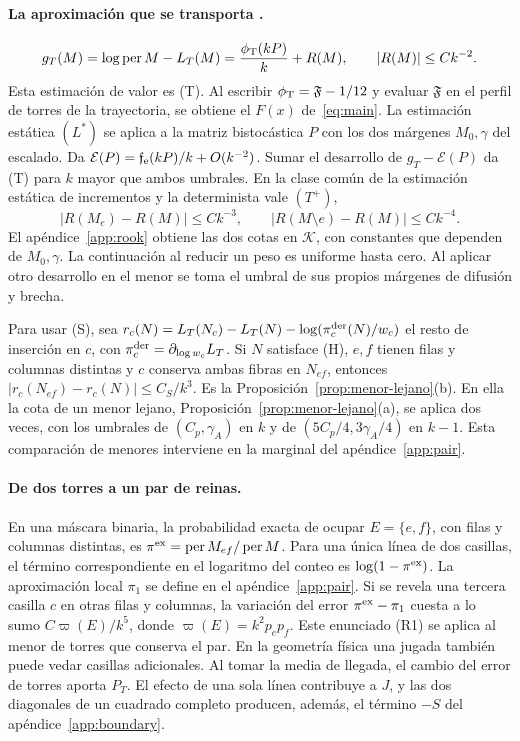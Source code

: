 \paragraph{La aproximación que se transporta .}
\[
   g_T(M)=\log\operatorname{per}M-L_T(M)
       =\frac{\phi_{\mathrm T}(kP)}k+R(M),\qquad |R(M)|\le Ck^{-2}.
\]
Esta estimación de valor es (T). Al escribir $\phi_{\mathrm T}=\mathfrak F-1/12$ y evaluar $\mathfrak F$ en
el perfil de torres de la trayectoria, se obtiene el $F(x)$ de~\eqref{eq:main}.
La estimación estática $(L^*)$ se aplica a la matriz bistocástica $P$ con los dos márgenes
$M_0,\gamma$ del escalado. Da $\mathcal E(P)=\mathfrak f_{\rm e}(kP)/k+O(k^{-2})$.
Sumar el desarrollo de $g_T-\mathcal E(P)$ da (T) para $k$ mayor que ambos umbrales.
En la clase común de la estimación estática de incrementos y la determinista vale $(T^+)$,
\[
 |R(M_e)-R(M)|\le Ck^{-3},\qquad |R(M\setminus e)-R(M)|\le Ck^{-4}.
\]
El apéndice~\ref{app:rook} obtiene las dos cotas en $\mathcal K$, con constantes que dependen de
$M_0,\gamma$. La continuación al reducir un peso es uniforme hasta cero. Al aplicar otro
desarrollo en el menor se toma el umbral de sus propios márgenes de difusión y brecha.

Para usar (S), sea $r_c(N)=L_T(N_c)-L_T(N)-\log(\pi_c^{\rm der}(N)/w_c)$ el resto
de inserción en $c$, con $\pi_c^{\rm der}=\partial_{\log w_c}L_T$. Si $N$ satisface (H),
$e,f$ tienen filas y columnas distintas y $c$ conserva ambas fibras en $N_{ef}$, entonces
$|r_c(N_{ef})-r_c(N)|\le C_S/k^3$. Es la Proposición~\ref{prop:menor-lejano}(b). En ella la cota de un
menor lejano,
Proposición~\ref{prop:menor-lejano}(a), se aplica dos veces, con los
umbrales de $(C_p,\gamma_A)$ en $k$ y de $(5C_p/4,3\gamma_A/4)$ en $k-1$.
Esta comparación de menores interviene en la marginal del apéndice~\ref{app:pair}.

\paragraph{De dos torres a un par de reinas.}
En una máscara binaria, la probabilidad exacta de ocupar $E=\{e,f\}$, con filas y columnas
distintas, es $\pi^{\rm ex}=\operatorname{per}M_{ef}/\operatorname{per}M$.
Para una única línea de dos casillas, el término correspondiente en el logaritmo del conteo es
$\log(1-\pi^{\rm ex})$. La aproximación local $\pi_1$ se define en el
apéndice~\ref{app:pair}. Si se revela una tercera casilla $c$ en otras filas y columnas,
la variación del error $\pi^{\rm ex}-\pi_1$ cuesta a lo sumo
$C\varpi(E)/k^5$, donde $\varpi(E)=k^2p_ep_f$. Este enunciado (R1) se aplica al menor de
torres que conserva el par. En la geometría física una jugada también puede vedar casillas
adicionales. Al tomar la media de llegada, el cambio del error de torres aporta $P_T$. El efecto
de una sola línea contribuye a $J$, y las dos diagonales de un cuadrado completo producen, además,
el término $-S$ del apéndice~\ref{app:boundary}.

